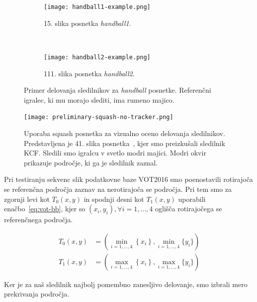 \begin{figure}[!htbp]
	\centering
	
	\begin{subfigure}[t]{0.45\columnwidth}
		\texttt{[image: handball1-example.png]}
		\caption{15. slika posnetka \textit{handball1}.}
		\label{fig:testiranje-handball1}
	\end{subfigure}
	~
	\begin{subfigure}[t]{0.45\columnwidth}
		\texttt{[image: handball2-example.png]}
		\caption{111. slika posnetka \textit{handball2}.}
		\label{fig:testiranje-handball2}
	\end{subfigure}  
	\caption[Primer delovanja sledilnikov za \textit{handball} posnetke]{Primer delovanja sledilnikov za \textit{handball} posnetke. Referenčni igralec, ki mu morajo slediti, ima rumeno majico. }
	\label{fig:testiranje-tracker-visual}
\end{figure}



\begin{figure}[htbp]
	\centering
	\texttt{[image: preliminary-squash-no-tracker.png]}
	\caption[Uporaba squash posnetka za vizualno oceno delovanja sledilnikov]{Uporaba squash posnetka za vizualno oceno delovanja sledilnikov. Predstavljena je 41. slika posnetka~\cite{squashtv2014squash}, kjer smo preizkušali sledilnik KCF. Sledili smo igralcu v svetlo modri majici. Modri okvir prikazuje področje, ki ga je sledilnik zaznal.}
	\label{fig:testiranje-squash-1-kcf}
\end{figure}



Pri testiranju sekvenc slik podatkovne baze VOT2016 smo poenostavili rotirajoča se referenčna področja zaznav na nerotirajoča se področja. Pri tem smo za zgornji levi kot $T_0(x,y)$ in spodnji desni kot $T_1(x,y)$ uporabili enačbo~\eqref{eq:vot-bb}, kjer so $\left( x_i, y_i\right), \forall i=1,\ldots,4$ oglišča rotirajočega se referenčnega področja. 

\begin{equation}
\begin{aligned}
T_0(x,y) &= \left( \min_{i = 1,\ldots,4}\left\{x_i \right\}, 
\min_{i=1,\ldots,4}\{y_i \} \right) \\
T_1(x,y) &= \left( \max_{i = 1,\ldots,4}\left\{x_i \right\}, 
\max_{i=1,\ldots,4}\{y_i \} \right)
\end{aligned}
\label{eq:vot-bb}
\end{equation}

Ker je za naš sledilnik najbolj pomembno zanesljivo delovanje, smo izbrali mero prekrivanja področja.


